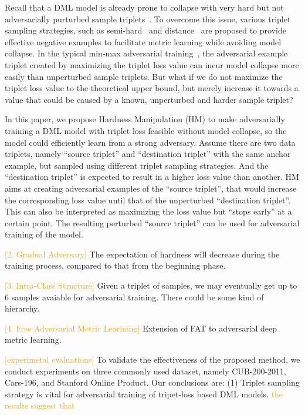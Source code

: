 \documentclass[10pt,twocolumn,letterpaper]{article}
\newcommand{\oo}[1]{\textcolor{orange}{#1}}
\begin{document}
Recall that a DML model is already prone to collapse with very hard but not
adversarially purturbed sample triplets~\cite{facenet}.
%
To overcome this issue, various triplet sampling strategies, such as
semi-hard~\cite{facenet} and distance~\cite{distance} are proposed to provide
effective negative examples to facilitate metric learning while avoiding model
collapse.
%
In the typical min-max adversarial training~\cite{madry}, the adversarial
example triplet created by maximizing the triplet loss value can incur model
collapse more easily than unperturbed sample triplets.
%
But what if we do not maximize the triplet loss value to the theoretical upper
bound, but merely increase it towards a value that could be caused by
a known, unperturbed and harder sample triplet?

In this paper, we propose Hardness Manipulation (HM) to make adversarially
training a DML model with triplet loss feasible without model collapse, so the
model could efficiently learn from a strong adversary.
%
Assume there are two data triplets, namely ``source triplet'' and ``destination
triplet'' with the same anchor example, but sampled using different triplet
sampling strategies.
%
And the ``destination triplet'' is expected to result in a higher loss value
than another.
%
HM aims at creating adversarial examples of the ``source triplet'', that would
increase the corresponding loss value until that of the unperturbed
``destination triplet''.
%
This can also be interpreted as maximizing the loss value but ``stops early''
at a certain point.
%
The resulting perturbed ``source triplet'' can be used for adversarial
training of the model.

\oo{[2. Gradual Adversary]}
The expectation of hardness will decrease during the training process,
compared to that from the beginning phase.

\oo{[3. Intra-Class Structure]}
Given a triplet of samples, we may eventually get up to 6 samples avaiable
for adversarial training. There could be some kind of hierarchy.

\oo{[4. Free Adversarial Metric Learining]}
Extension of FAT to adversarial deep metric learning.

\oo{[experimetal evaluations]}
To validate the effectiveness of the proposed method, we conduct experiments
on three commonly used dataset, namely CUB-200-2011, Cars-196, and Stanford
Online Product. Our conclusions are:
%
(1) Triplet sampling strategy is vital for adversarial training of tripet-loss
based DML models.
%
\oo{the results suggest that}
\end{document}
